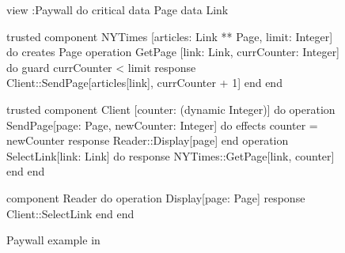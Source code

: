  \begin{figure}[ht]
\centering
  \begin{slang}
view :Paywall do
  critical data Page
  data Link
  
  trusted component NYTimes [articles: Link ** Page, limit: Integer] do
    creates Page
    operation GetPage [link: Link, currCounter: Integer] do
      guard    { currCounter < limit }
      response { Client::SendPage[articles[link], currCounter + 1] }
    end
  end

  trusted component Client [counter: (dynamic Integer)] do
    operation SendPage[page: Page, newCounter: Integer] do 
      effects  { counter = newCounter }
      response { Reader::Display[page] }
    end
    operation SelectLink[link: Link] do
      response { NYTimes::GetPage[link, counter] }
    end
  end

  component Reader do
    operation Display[page: Page]
    response { Client::SelectLink }
  end
end
  \end{slang}

\caption{Paywall example in \sLang}
\label{fig-paywall-slang}
\end{figure}
